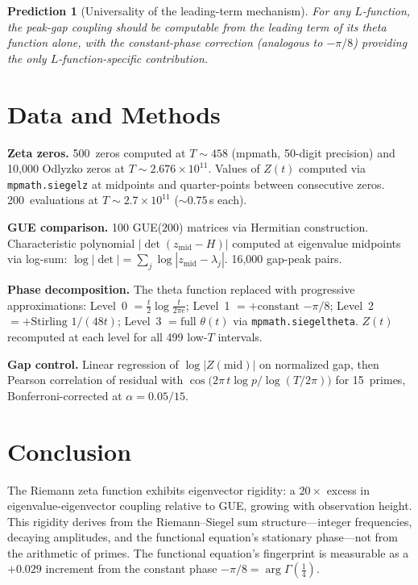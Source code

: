 \documentclass[11pt,a4paper]{article}
\newtheorem{prediction}{Prediction}
\begin{document}
\begin{prediction}[Universality of the leading-term mechanism]
For any $L$-function, the peak-gap coupling should be computable from the leading term of its theta function alone, with the constant-phase correction (analogous to $-\pi/8$) providing the only $L$-function-specific contribution.
\end{prediction}

\section{Data and Methods}

\textbf{Zeta zeros.}
500~zeros computed at $T \sim 458$ (mpmath, 50-digit precision) and 10{,}000 Odlyzko zeros at $T \sim 2.676 \times 10^{11}$.
Values of $Z(t)$ computed via \texttt{mpmath.siegelz} at midpoints and quarter-points between consecutive zeros.
200~evaluations at $T \sim 2.7 \times 10^{11}$ (${\sim}0.75$\,s each).

\textbf{GUE comparison.}
100 GUE($200$) matrices via Hermitian construction.
Characteristic polynomial $|\det(z_{\mathrm{mid}} - H)|$ computed at eigenvalue midpoints via log-sum: $\log|\det| = \sum_j \log|z_{\mathrm{mid}} - \lambda_j|$.
16{,}000 gap-peak pairs.

\textbf{Phase decomposition.}
The theta function replaced with progressive approximations:
Level~0 $= \tfrac{t}{2}\log\tfrac{t}{2\pi e}$;
Level~1 $= {+}\text{constant } {-\pi/8}$;
Level~2 $= {+}\text{Stirling } 1/(48t)$;
Level~3 $= \text{full } \theta(t)$ via \texttt{mpmath.siegeltheta}.
$Z(t)$ recomputed at each level for all 499 low-$T$ intervals.

\textbf{Gap control.}
Linear regression of $\log|Z(\mathrm{mid})|$ on normalized gap, then Pearson correlation of residual with $\cos\!\bigl(2\pi\,t\log p / \log(T/2\pi)\bigr)$ for 15~primes, Bonferroni-corrected at $\alpha = 0.05/15$.

\section{Conclusion}

The Riemann zeta function exhibits eigenvector rigidity: a $20\times$ excess in eigenvalue-eigenvector coupling relative to GUE, growing with observation height.
This rigidity derives from the Riemann--Siegel sum structure---integer frequencies, decaying amplitudes, and the functional equation's stationary phase---not from the arithmetic of primes.
The functional equation's fingerprint is measurable as a $+0.029$ increment from the constant phase $-\pi/8 = \arg\Gamma(\tfrac{1}{4})$.
\end{document}
